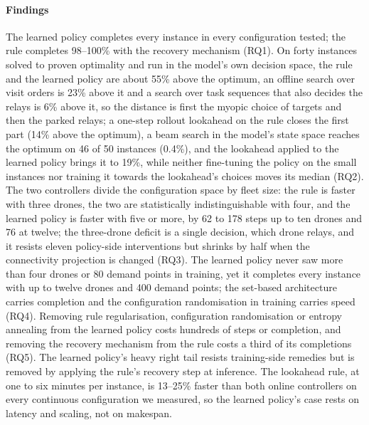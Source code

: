 \documentclass[final,5p,times,twocolumn]{elsarticle}
\begin{document}
\paragraph{Findings}
The learned policy completes every instance in every configuration tested; the rule
completes 98--100\% with the recovery mechanism (RQ1). On forty instances solved to proven optimality and run in the model's own decision space, the
rule and the learned policy are about 55\% above the optimum, an offline search over visit orders
is 23\% above it and a search over task sequences that also decides the relays is 6\% above it,
so the distance is first the myopic choice of targets and then the parked relays; a one-step
rollout lookahead on the rule closes the first part (14\% above the optimum), a beam search in the
model's state space reaches the optimum on 46 of 50 instances (0.4\%), and the lookahead applied to
the learned policy brings it to 19\%, while neither fine-tuning the policy on the small instances
nor training it towards the lookahead's choices moves its median (RQ2). The two controllers
divide the configuration space by fleet size: the rule is faster with three drones, the two
are statistically indistinguishable with four, and the learned policy is faster with five or more,
by 62 to 178 steps up to ten drones and 76 at twelve; the three-drone deficit is a single
decision, which drone relays, and it resists eleven policy-side interventions but shrinks by half
when the connectivity projection is changed (RQ3). The learned policy never saw more than four
drones or 80 demand points in training, yet it completes every instance with up to twelve drones and
400 demand points; the set-based architecture carries completion and the configuration
randomisation in training carries speed (RQ4). Removing rule regularisation, configuration
randomisation or entropy annealing from the learned policy costs hundreds of steps or completion,
and removing the recovery mechanism from the rule costs a third of its completions (RQ5).
The learned policy's heavy right tail resists training-side remedies but is removed by applying
the rule's recovery step at inference. The lookahead rule, at one to six minutes per instance, is
13--25\% faster than both online controllers on every continuous configuration we measured, so
the learned policy's case rests on latency and scaling, not on makespan.
\end{document}
